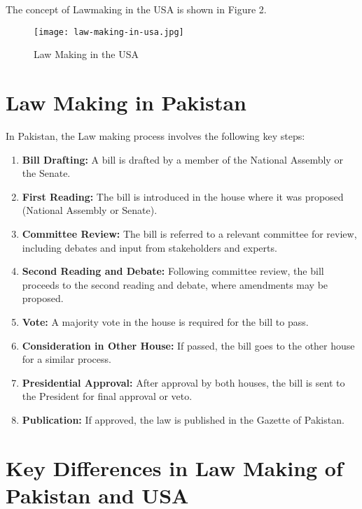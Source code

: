 \documentclass{article}
\begin{document}
The concept of Lawmaking in the USA is shown in Figure 2.
\begin{figure}
  \centering
  \texttt{[image: law-making-in-usa.jpg]}
  \caption{Law Making in the USA}
  \label{fig:law-making-in-usa}
\end{figure}



\section{Law Making in Pakistan}
In Pakistan, the Law making process involves the following key steps:


\begin{enumerate}[label=\arabic*.]
    \item \textbf{Bill Drafting:} A bill is drafted by a member of the National Assembly or the Senate.
    
    \item \textbf{First Reading:} The bill is introduced in the house where it was proposed (National Assembly or Senate).
    
    \item \textbf{Committee Review:} The bill is referred to a relevant committee for review, including debates and input from stakeholders and experts.
    
    \item \textbf{Second Reading and Debate:} Following committee review, the bill proceeds to the second reading and debate, where amendments may be proposed.
    
    \item \textbf{Vote:} A majority vote in the house is required for the bill to pass.
    
    \item \textbf{Consideration in Other House:} If passed, the bill goes to the other house for a similar process.
    
    \item \textbf{Presidential Approval:} After approval by both houses, the bill is sent to the President for final approval or veto.
    
    \item \textbf{Publication:} If approved, the law is published in the Gazette of Pakistan.
\end{enumerate}


\section{Key Differences in Law Making of Pakistan and USA}
\end{document}
